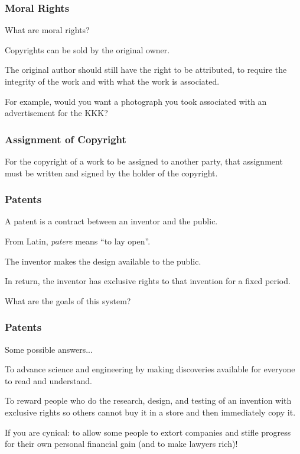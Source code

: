 \begin{frame}
\frametitle{Moral Rights}

What are moral rights?

Copyrights can be sold by the original owner.

The original author should still have the right to be attributed, to require the integrity of the work and with what the work is associated.

For example, would you want a photograph you took associated with an advertisement for the KKK?

\end{frame}



\begin{frame}
\frametitle{Assignment of Copyright}

For the copyright of a work to be assigned to another party, that assignment must be written and signed by the holder of the copyright.

\end{frame}



\begin{frame}
\frametitle{Patents}

A patent is a contract between an inventor and the public.

From Latin, \textit{patere} means ``to lay open''.

The inventor makes the design available to the public.

In return, the inventor has exclusive rights to that invention for a fixed period.

What are the goals of this system?

\end{frame}



\begin{frame}
\frametitle{Patents}

Some possible answers...

To advance science and engineering by making discoveries available for everyone to read and understand.

To reward people who do the research, design, and testing of an invention with exclusive rights so others cannot buy it in a store and then immediately copy it.

If you are cynical: to allow some people to extort companies and stifle progress for their own personal financial gain (and to make lawyers rich)!

\end{frame}




